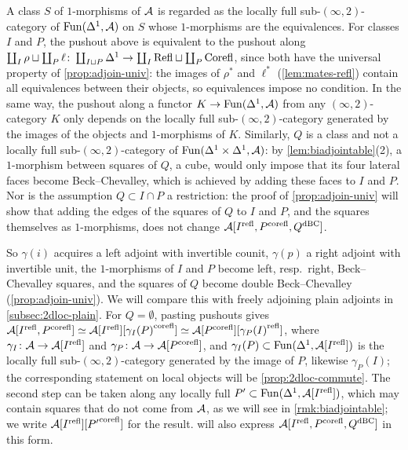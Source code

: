 %
A class $S$ of $1$-morphisms of $\mathcal{A}$ is regarded as the locally full
sub-$(\infty,2)$-category of $\operatorname{Fun}(\Delta^{1},\mathcal{A})$ on $S$ whose $1$-morphisms
are the equivalences. For classes $I$ and $P$,
the pushout above is equivalent to the pushout along
$\coprod_{I}\rho \sqcup \coprod_{P}\ell\colon \coprod_{I \sqcup P}\Delta^{1} \to
\coprod_{I}\mathrm{Refl} \sqcup \coprod_{P}\mathrm{Corefl}$,
since both have the universal property of \cref{prop:adjoin-univ}:
the images of $\rho^{*}$ and $\ell^{*}$ (\cref{lem:mates-refl}) contain all
equivalences between their objects, so equivalences impose no condition.
In the same way, the pushout along a functor
$K \to \operatorname{Fun}(\Delta^{1},\mathcal{A})$
from any $(\infty,2)$-category $K$ only depends on the locally full
sub-$(\infty,2)$-category generated by the images of the objects and
$1$-morphisms of $K$.
Similarly, $Q$ is a class and not a locally full sub-$(\infty,2)$-category of
$\operatorname{Fun}(\Delta^{1} \times \Delta^{1},\mathcal{A})$:
by \cref{lem:biadjointable}(2),
a $1$-morphism between squares of $Q$, a cube, would only impose that its four
lateral faces become Beck--Chevalley, which is achieved by adding these faces to
$I$ and $P$.
Nor is the assumption $Q \subset I \cap P$ a restriction:
the proof of \cref{prop:adjoin-univ} will show that adding the edges of the
squares of $Q$ to $I$ and $P$, and the squares themselves as $1$-morphisms,
does not change $\mathcal{A}[{I}^{\mathrm{refl}},{P}^{\mathrm{corefl}},{Q}^{\mathrm{dBC}}]$.

%
So $\gamma(i)$ acquires a left adjoint with invertible counit,
$\gamma(p)$ a right adjoint with invertible unit,
the $1$-morphisms of $I$ and $P$ become left, resp.\ right,
Beck--Chevalley squares, and the squares of $Q$ become double Beck--Chevalley
(\cref{prop:adjoin-univ}).
We will compare this with freely adjoining plain adjoints in
\cref{subsec:2dloc-plain}.
For $Q = \emptyset$, pasting pushouts gives
$\mathcal{A}[{I}^{\mathrm{refl}},{P}^{\mathrm{corefl}}] \simeq \mathcal{A}[{I}^{\mathrm{refl}}][{\gamma_{I}(P)}^{\mathrm{corefl}}] \simeq
\mathcal{A}[{P}^{\mathrm{corefl}}][{\gamma_{P}(I)}^{\mathrm{refl}}]$,
where
$\gamma_{I}\colon \mathcal{A} \to \mathcal{A}[{I}^{\mathrm{refl}}]$
and
$\gamma_{P}\colon \mathcal{A} \to \mathcal{A}[{P}^{\mathrm{corefl}}]$,
and
$\gamma_{I}(P) \subset \operatorname{Fun}(\Delta^{1},\mathcal{A}[{I}^{\mathrm{refl}}])$
is the locally full sub-$(\infty,2)$-category generated by the image of $P$,
likewise $\gamma_{P}(I)$; the corresponding statement on local objects will be
\cref{prop:2dloc-commute}. The second step can be taken along any locally full
$P' \subset \operatorname{Fun}(\Delta^{1},\mathcal{A}[{I}^{\mathrm{refl}}])$,
which may contain squares that do not come from $\mathcal{A}$,
as we will see in \cref{rmk:biadjointable}; we write
$\mathcal{A}[{I}^{\mathrm{refl}}][{P'}^{\mathrm{corefl}}]$
for the result.  will also express
$\mathcal{A}[{I}^{\mathrm{refl}},{P}^{\mathrm{corefl}},{Q}^{\mathrm{dBC}}]$
in this form.

